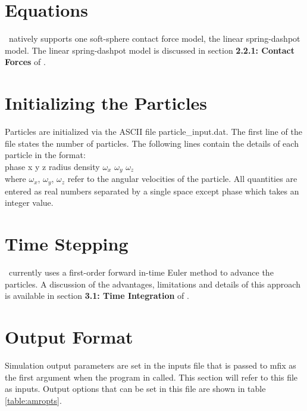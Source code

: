 \section{Equations}

\mfix\ natively supports one soft-sphere contact force model, the linear
spring-dashpot model. The linear spring-dashpot model is discussed in
section {\bf 2.2.1: Contact Forces} of \demdoc.


\section{Initializing the Particles}

Particles are initialized via the ASCII file {\sf particle\_input.dat}. The
first line of the file states the number of particles. The following lines
contain the details of each particle in the format: \\

{\sf phase x y z radius density $\omega_x$ $\omega_y$ $\omega_z$}  \\

\noindent
where {\sf $\omega_x$, $\omega_y$, $\omega_z$} refer to the angular velocities
 of the particle. All quantities are entered as real numbers separated by a
single space except {\sf phase} which takes an integer value.


%



\section{Time Stepping}

\mfix\ currently uses a first-order forward in-time Euler method to advance
the particles. A discussion of the advantages, limitations and details of this
approach is available in section {\bf 3.1: Time Integration} of \demdoc.

\section{Output Format}

Simulation output parameters are set in the inputs file that is passed to mfix
as the first argument when the program in called. This section will refer
to this file as {\sf inputs}. Output options that can be set in this file are
shown in table \ref{table:amropts}.

